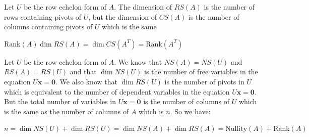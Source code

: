 \documentclass{report}
\begin{document}
\begin{myproof}
    Let $U$ be the row echelon form of  $A$. The dimension of  $RS(A)$ is the number of rows containing pivots of $U$, but the dimension of  $CS(A)$ is the number of columns containing pivots of  $U$ which is the same
\end{myproof}


\begin{myproof}
    $ \mathrm{Rank}(A) \dim RS(A) = \dim CS(A^T) = \mathrm{Rank}(A^T)$
\end{myproof}

\begin{myproof}
    Let $U$ be the row echelon form of  $A$. We know that  $NS(A)=NS(U)$ and  $RS(A)=RS(U)$ and that $\dim NS(U)$ is the number of free variables in the equation  $U \mathbf{x}=\mathbf{0}$. We also know that $\dim RS(U)$ is the number of pivots in  $U$ which is equivalent to the number of dependent variables in the equation $U \mathbf{x} = \mathbf{0}$. But the total number of variables in $U \mathbf{x} = \mathbf{0}$ is the number of columns of $U$ which is the same as the number of columns of  $A$ which is  $n$. So we have:
    \begin{center}
         $n = \dim NS(U) + \dim RS(U) = \dim NS(A) + \dim RS(A) = \mathrm{Nullity}(A) + \mathrm{Rank}(A)$
    \end{center}
\end{myproof}
\end{document}
